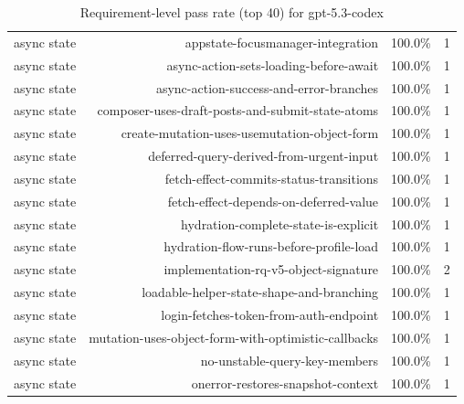 \begin{table}[htbp]
\begin{tabular}{lrrr}
async state & appstate-focusmanager-integration & 100.0\% & 1 \\
async state & async-action-sets-loading-before-await & 100.0\% & 1 \\
async state & async-action-success-and-error-branches & 100.0\% & 1 \\
async state & composer-uses-draft-posts-and-submit-state-atoms & 100.0\% & 1 \\
async state & create-mutation-uses-usemutation-object-form & 100.0\% & 1 \\
async state & deferred-query-derived-from-urgent-input & 100.0\% & 1 \\
async state & fetch-effect-commits-status-transitions & 100.0\% & 1 \\
async state & fetch-effect-depends-on-deferred-value & 100.0\% & 1 \\
async state & hydration-complete-state-is-explicit & 100.0\% & 1 \\
async state & hydration-flow-runs-before-profile-load & 100.0\% & 1 \\
async state & implementation-rq-v5-object-signature & 100.0\% & 2 \\
async state & loadable-helper-state-shape-and-branching & 100.0\% & 1 \\
async state & login-fetches-token-from-auth-endpoint & 100.0\% & 1 \\
async state & mutation-uses-object-form-with-optimistic-callbacks & 100.0\% & 1 \\
async state & no-unstable-query-key-members & 100.0\% & 1 \\
async state & onerror-restores-snapshot-context & 100.0\% & 1 \\
\bottomrule
\end{tabular}
\caption{Requirement-level pass rate (top 40) for gpt-5.3-codex}
\end{table}
